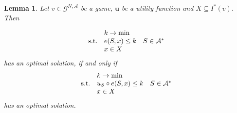 \documentclass[a4paper,12pt]{article}
\newtheorem{lemma}[theorem]{Lemma}
\theoremstyle{definition}
\theoremstyle{remark}
\begin{document}
\begin{lemma}\label{lemma:lin2u}
Let $v \in \mathcal{G}^{N, \mathcal{A}}$ be a game, $\mathbf{u}$ be a utility function and $X \subseteq I^*(v)$. Then

\begin{equation}\label{eq:lemma_lin}
\begin{array}{llr}
& k  \to \min & \\
\textup{s.t.} & e(S, x) \leq k & S\in \mathcal{A}^* \\
& x \in X & \\
\end{array}
\end{equation}
has an optimal solution, if and only if
\begin{equation}\label{eq:lemma_u_1}
\begin{array}{llr}
& k \to \min & \\
\textup{s.t.} & u_S \circ e(S, x) \leq k & S\in \mathcal{A}^* \\
& x \in X & \\
\end{array}
\end{equation}
has an optimal solution.
\end{lemma}
\end{document}
